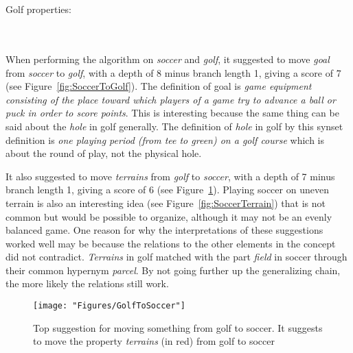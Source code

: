 \noindent{}
\\\\Golf properties:
	
\noindent{}
\\\\When performing the algorithm on \emph{soccer} and \emph{golf}, it suggested to move \emph{goal} from \emph{soccer} to \emph{golf}, with a depth of 8 minus branch length 1, giving a score of 7 (see Figure~\ref{fig:SoccerToGolf}). The definition of goal is \emph{game equipment consisting of the place toward which players of a game try to advance a ball or puck in order to score points}. This is interesting because the same thing can be said about the \emph{hole} in golf generally. The definition of \emph{hole} in golf by this synset definition is \emph{one playing period (from tee to green) on a golf course} which is about the round of play, not the physical hole.


It also suggested to move \emph{terrains} from \emph{golf} to \emph{soccer}, with a depth of 7 minus branch length 1, giving a score of 6 (see Figure~\ref{fig:GolfToSoccer}).
Playing soccer on uneven terrain is also an interesting idea (see Figure~\ref{fig:SoccerTerrain}) that is not common but would be possible to organize, although it may not be an evenly balanced game. One reason for why the interpretations of these suggestions worked well may be because the relations to the other elements in the concept did not contradict. \emph{Terrains} in golf matched with the part \emph{field} in soccer through their common hypernym \emph{parcel}. By not going further up the generalizing chain, the more likely the relations still work.

\begin{figure} \centering \texttt{[image: "Figures/GolfToSoccer"]} \caption[Blending soccer and golf]{Top suggestion for moving something from golf to soccer. It suggests to move the property \emph{terrains} (in red) from golf to soccer} \label{fig:GolfToSoccer} \end{figure}

